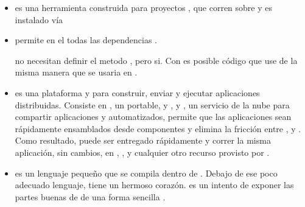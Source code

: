 	\begin{itemize}
		\item
			\textbf{\grunttool} es una herramienta \commandLine \taskBased construida para proyectos \javaScriptNAME, que corren sobre \nodejsNAME y es instalado vía \npm \cite{technology_gruntjs}

		\item
			\textbf{\browserifyNAME} permite \requireINT \modulesAS en el \browsersINT \bundlingUpCPT todas las dependencias \cite{online_official_website_browserify}.

			\browsersINT no necesitan definir el metodo \requestINT, pero \nodejsNAME si. Con \browserifyNAME es posible \writeCPT código que use \requireINT de la misma manera que se usaria en \nodejsNAME  \cite{online_official_website_browserify}.

		\item
			\textbf{\docker} es una plataforma \openSourcePC y \sysadmins para construir, enviar y ejecutar aplicaciones distribuidas. Consiste en \docker \engine, un portable, \lightweightPL \runtime y \packaging \tool, y \docker \hub, un servicio de la nube para compartir aplicaciones y \workflows automatizados, \docker permite que las aplicaciones sean rápidamente ensamblados desde componentes y elimina la fricción entre \developmentPC, \qaSIGLA y \production \environments. Como resultado, puede ser entregado rápidamente y correr la misma aplicación, sin cambios, en \laptops, \dataPC \centerCustom \vmsSIGLA, y cualquier otro recurso provisto por \internet \cite{technology_docker}.

		\item
			\textbf{\coffeescript} es un lenguaje pequeño que se compila dentro de \javaScriptNAME. Debajo de ese poco adecuado lenguaje, \javaScriptNAME tiene un hermoso corazón. \coffeescript es un intento de exponer las partes buenas de \javaScriptNAME de una forma sencilla \cite{technology_coffeescript}.
		

\end{itemize}
